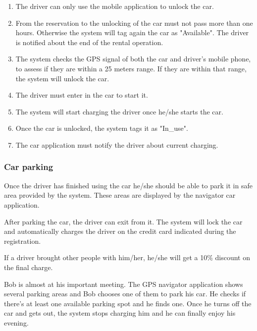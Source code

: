 \begin{enumerate}
	\item The driver can only use the mobile application to unlock the car. 
	\item From the reservation to the unlocking of the car must not pass more than one hours. Otherwise the system will tag again the car as "Available". The driver is notified about the end of the rental operation.\label{f-reservationcanc}
	\item The system checks the GPS signal of both the car and driver's mobile phone, to assess if they are within a 25 meters range. If they are within that range, the system will unlock the car. \label{f-nearby}
	\item The driver must enter in the car to start it.
	\item The system will start charging the driver once he/she starts the car.
	\item Once the car is unlocked, the system tags it as "In\_use".
	\item The car application must notify the driver about current charging.	
\end{enumerate}

\subsubsection{Car parking}


Once the driver has finished using the car he/she should be able to park it in safe area provided by the system. These areas are displayed by the navigator car application.

After parking the car, the driver can exit from it. The system will lock the car and automatically charges the driver on the credit card indicated during the registration.

If a driver brought other people with him/her, he/she will get a 10\% discount on the final charge.


Bob is almost at his important meeting. The GPS navigator application shows several parking areas and Bob chooses one of them to park his car. He checks if there's at least one available parking spot and he finds one. Once he turns off the car and gets out, the system stops charging him and he can finally enjoy his evening.

